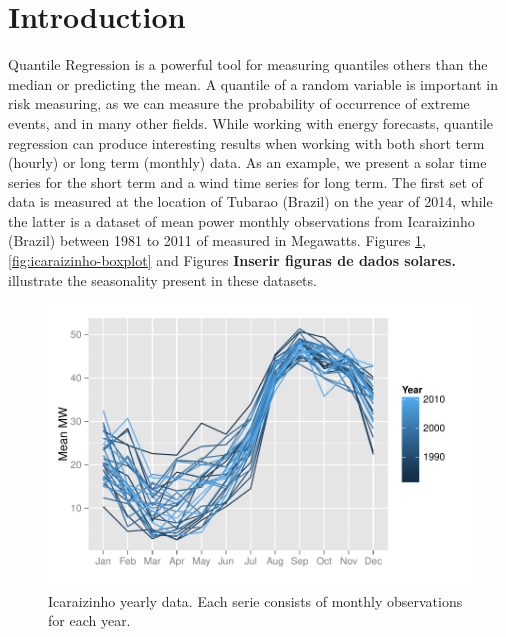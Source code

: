 \section{Introduction}




Quantile Regression is a powerful tool for measuring quantiles others than the median or predicting the mean. A quantile of a random variable is important in risk measuring, as we can measure the probability of occurrence of extreme events, and in many other fields. While working with energy forecasts, quantile regression can produce interesting results when working with both short term (hourly) or long term (monthly) data. As an example, we present a solar time series for the short term and a wind time series for long term. The first set of data is measured at the location of Tubarao (Brazil) on the year of 2014, while the latter is a dataset of mean power  monthly observations from Icaraizinho (Brazil) between 1981 to 2011 of measured in Megawatts. Figures \ref{fig:icaraizinho-mensal}, \ref{fig:icaraizinho-boxplot} and Figures \textbf{Inserir figuras de dados solares.} illustrate the seasonality present in these datasets.

\begin{figure}[h]
	\centering
	\includegraphics[width=0.8\linewidth]{./Figuras/Icaraizinho/icaraizinho-mensal}
	\caption{Icaraizinho yearly data. Each serie consists of monthly observations for each year.}
	\label{fig:icaraizinho-mensal}
\end{figure}


